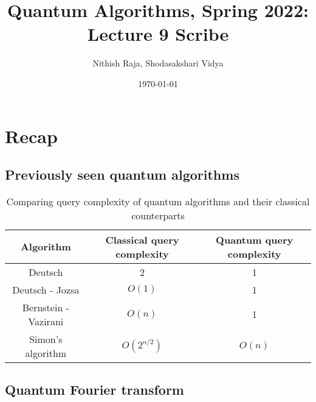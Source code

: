 \documentclass[11.5pt, paper=a4]{article}
\title{Quantum Algorithms, Spring 2022: Lecture 9 Scribe}
\author{Nithish Raja, Shodasakshari Vidya}
\date{\today}
\theoremstyle{definition}
\numberwithin{theorem}{section}
\begin{document}
\maketitle

\section{Recap}

\subsection{Previously seen quantum algorithms}

\begin{table}[h!]
    \centering
    \vline
    \begin{tabular}{c|c|c}
        \hline
         \textbf{Algorithm} & \textbf{Classical query complexity} & \textbf{Quantum query complexity}  \\
         \hline
         Deutsch & 2 & 1 \\
         Deutsch - Jozsa & $O(1)$ & 1 \\
         Bernstein - Vazirani & $O(n)$ & 1 \\
         Simon's algorithm & $O(2^{n/2})$ & $O(n)$ \\
         \hline
    \end{tabular}
    \vline
    \caption{Comparing query complexity of quantum algorithms and their classical counterparts}
    \label{tab:my_label}
\end{table}

\subsection{Quantum Fourier transform}
\end{document}
